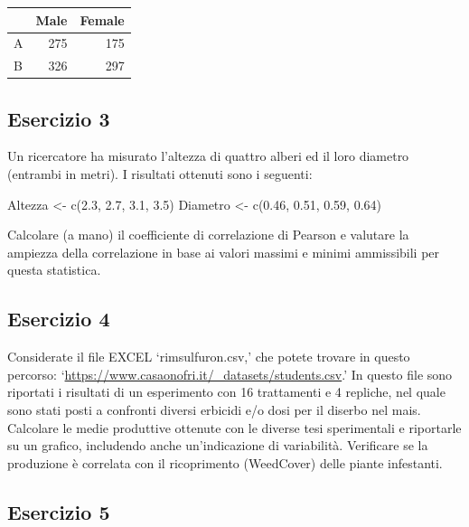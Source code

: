 \documentclass[a4paper,12pt,oneside]{book}
\newenvironment{Shaded}{\begin{snugshade}}{\end{snugshade}}
\newcommand{\FloatTok}[1]{#1}
\newcommand{\OtherTok}[1]{#1}
\newcommand{\FunctionTok}[1]{#1}
\newcommand{\NormalTok}[1]{#1}
\begin{document}
\begin{tabular}{l|r|r}
\hline
  & Male & Female\\
\hline
A & 275 & 175\\
\hline
B & 326 & 297\\
\hline
\end{tabular}

\hypertarget{esercizio-3-1}{%
\subsection{Esercizio 3}\label{esercizio-3-1}}

Un ricercatore ha misurato l'altezza di quattro alberi ed il loro diametro (entrambi in metri). I risultati ottenuti sono i seguenti:

\begin{Shaded}
\begin{Highlighting}[]
\NormalTok{Altezza }\OtherTok{\textless{}{-}} \FunctionTok{c}\NormalTok{(}\FloatTok{2.3}\NormalTok{, }\FloatTok{2.7}\NormalTok{, }\FloatTok{3.1}\NormalTok{, }\FloatTok{3.5}\NormalTok{)}
\NormalTok{Diametro }\OtherTok{\textless{}{-}} \FunctionTok{c}\NormalTok{(}\FloatTok{0.46}\NormalTok{, }\FloatTok{0.51}\NormalTok{, }\FloatTok{0.59}\NormalTok{, }\FloatTok{0.64}\NormalTok{)}
\end{Highlighting}
\end{Shaded}

Calcolare (a mano) il coefficiente di correlazione di Pearson e valutare la ampiezza della correlazione in base ai valori massimi e minimi ammissibili per questa statistica.

\hypertarget{esercizio-4-1}{%
\subsection{Esercizio 4}\label{esercizio-4-1}}

Considerate il file EXCEL `rimsulfuron.csv,' che potete trovare in questo percorso: `\url{https://www.casaonofri.it/_datasets/students.csv}.' In questo file sono riportati i risultati di un esperimento con 16 trattamenti e 4 repliche, nel quale sono stati posti a confronti diversi erbicidi e/o dosi per il diserbo nel mais. Calcolare le medie produttive ottenute con le diverse tesi sperimentali e riportarle su un grafico, includendo anche un'indicazione di variabilità. Verificare se la produzione è correlata con il ricoprimento (WeedCover) delle piante infestanti.

\hypertarget{esercizio-5-1}{%
\subsection{Esercizio 5}\label{esercizio-5-1}}
\end{document}
